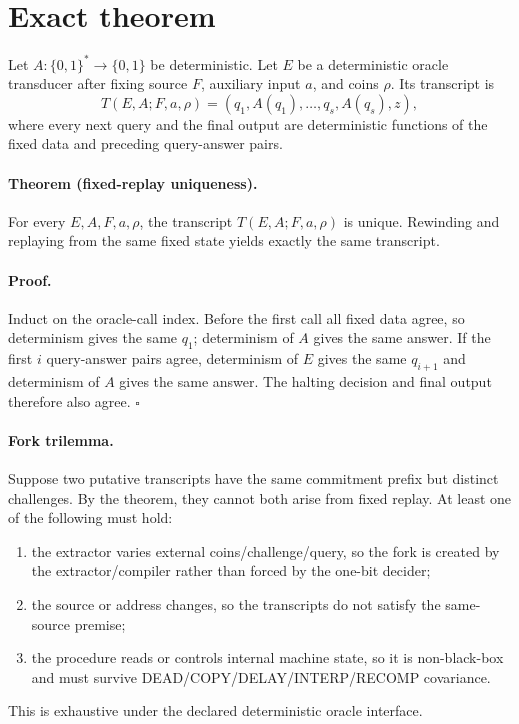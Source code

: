 \documentclass[11pt]{article}
\begin{document}
\section*{Exact theorem}

Let $A:\{0,1\}^*\to\{0,1\}$ be deterministic.  Let $E$ be a deterministic
oracle transducer after fixing source $F$, auxiliary input $a$, and coins
$\rho$.  Its transcript is
\[
 T(E,A;F,a,\rho)=
 (q_1,A(q_1),\ldots,q_s,A(q_s),z),
\]
where every next query and the final output are deterministic functions of the
fixed data and preceding query-answer pairs.

\paragraph{Theorem (fixed-replay uniqueness).}
For every $E,A,F,a,\rho$, the transcript $T(E,A;F,a,\rho)$ is unique.  Rewinding
and replaying from the same fixed state yields exactly the same transcript.

\paragraph{Proof.}
Induct on the oracle-call index.  Before the first call all fixed data agree,
so determinism gives the same $q_1$; determinism of $A$ gives the same answer.
If the first $i$ query-answer pairs agree, determinism of $E$ gives the same
$q_{i+1}$ and determinism of $A$ gives the same answer.  The halting decision
and final output therefore also agree. \hfill$\square$

\paragraph{Fork trilemma.}
Suppose two putative transcripts have the same commitment prefix but distinct
challenges.  By the theorem, they cannot both arise from fixed replay.  At
least one of the following must hold:
\begin{enumerate}
\item the extractor varies external coins/challenge/query, so the fork is
created by the extractor/compiler rather than forced by the one-bit decider;
\item the source or address changes, so the transcripts do not satisfy the
same-source premise;
\item the procedure reads or controls internal machine state, so it is
non-black-box and must survive DEAD/COPY/DELAY/INTERP/RECOMP covariance.
\end{enumerate}
This is exhaustive under the declared deterministic oracle interface.
\end{document}
